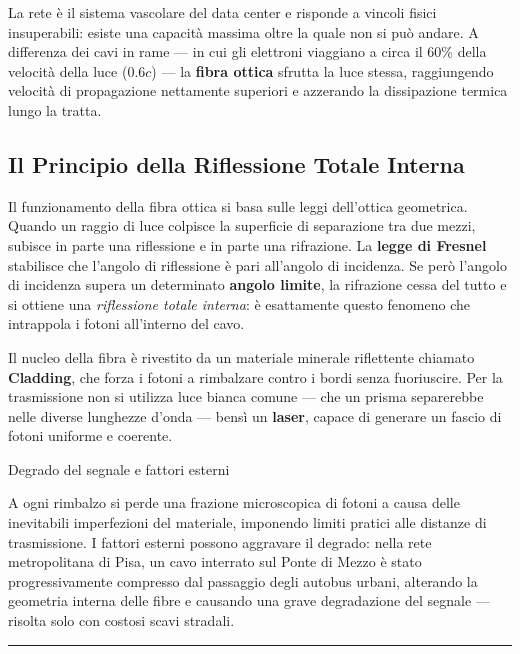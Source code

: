 \documentclass[
  italian,
  openany]{book}
\begin{document}
La rete è il sistema vascolare del data center e risponde a vincoli
fisici insuperabili: esiste una capacità massima oltre la quale non si
può andare. A differenza dei cavi in rame --- in cui gli elettroni
viaggiano a circa il 60\% della velocità della luce (\(0.6c\)) --- la
\textbf{fibra ottica} sfrutta la luce stessa, raggiungendo velocità di
propagazione nettamente superiori e azzerando la dissipazione termica
lungo la tratta.

\subsection{Il Principio della Riflessione Totale
Interna}\label{il-principio-della-riflessione-totale-interna}

Il funzionamento della fibra ottica si basa sulle leggi dell'ottica
geometrica. Quando un raggio di luce colpisce la superficie di
separazione tra due mezzi, subisce in parte una riflessione e in parte
una rifrazione. La \textbf{legge di Fresnel} stabilisce che l'angolo di
riflessione è pari all'angolo di incidenza. Se però l'angolo di
incidenza supera un determinato \textbf{angolo limite}, la rifrazione
cessa del tutto e si ottiene una \emph{riflessione totale interna}: è
esattamente questo fenomeno che intrappola i fotoni all'interno del
cavo.

Il nucleo della fibra è rivestito da un materiale minerale riflettente
chiamato \textbf{Cladding}, che forza i fotoni a rimbalzare contro i
bordi senza fuoriuscire. Per la trasmissione non si utilizza luce bianca
comune --- che un prisma separerebbe nelle diverse lunghezze d'onda ---
bensì un \textbf{laser}, capace di generare un fascio di fotoni uniforme
e coerente.

\begin{calloutnote}{Degrado del segnale e fattori esterni}

A ogni rimbalzo si perde una frazione microscopica di fotoni a causa
delle inevitabili imperfezioni del materiale, imponendo limiti pratici
alle distanze di trasmissione. I fattori esterni possono aggravare il
degrado: nella rete metropolitana di Pisa, un cavo interrato sul Ponte
di Mezzo è stato progressivamente compresso dal passaggio degli autobus
urbani, alterando la geometria interna delle fibre e causando una grave
degradazione del segnale --- risolta solo con costosi scavi stradali.

\end{calloutnote}

\begin{center}\rule{0.5\linewidth}{0.5pt}\end{center}
\end{document}
